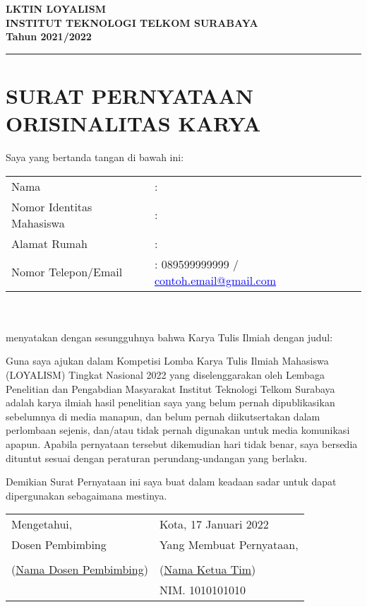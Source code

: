 \begin{center}
    \large \textbf{LKTIN LOYALISM}\\[1ex]
    \large \textbf{INSTITUT TEKNOLOGI TELKOM SURABAYA\\[1ex]
    \large Tahun 2021/2022}
\end{center}
\rule{\textwidth}{1pt}
\section*{\centering SURAT PERNYATAAN ORISINALITAS KARYA}
\noindent Saya yang bertanda tangan di bawah ini:\\

\noindent \begin{tabular}{@{}p{}p{}}
Nama &: \\[.5ex]
Nomor Identitas Mahasiswa &: \\[.5ex]
Alamat Rumah &: \\[.5ex]
Nomor Telepon/Email &: 089599999999 / \href{mailto:contoh.email@gmail.com}{\textcolor{blue}{\underline{contoh.email@gmail.com}}}
\end{tabular}
\\
\vspace{.2cm}
\\
menyatakan dengan sesungguhnya bahwa Karya Tulis Ilmiah dengan judul:

\vspace*{.2cm}

\noindent \textbf{}

\vspace*{.2cm}

\noindent Guna saya ajukan dalam Kompetisi Lomba Karya Tulis Ilmiah Mahasiswa (LOYALISM) Tingkat Nasional 2022 yang diselenggarakan oleh Lembaga Penelitian dan Pengabdian Masyarakat Institut Teknologi Telkom Surabaya adalah karya ilmiah hasil penelitian saya yang belum pernah dipublikasikan sebelumnya di media manapun, dan belum pernah diikutsertakan dalam perlombaan sejenis, dan/atau tidak pernah digunakan untuk media komunikasi apapun. Apabila pernyataan tersebut dikemudian hari tidak benar, saya bersedia dituntut sesuai dengan peraturan perundang-undangan yang berlaku.

\vspace*{.2cm}

\noindent Demikian Surat Pernyataan ini saya buat dalam keadaan sadar untuk dapat dipergunakan sebagaimana mestinya. 
\begin{center}
\begin{tabular}{K{.5\textwidth}K{.5\textwidth}}
     Mengetahui, & Kota, 17 Januari 2022 \\
     Dosen Pembimbing & Yang Membuat Pernyataan,\\
     & \\[10ex]
     (\underline{\quad\quad Nama Dosen Pembimbing\quad\quad}) & (\underline{\quad\quad Nama Ketua Tim\quad\quad})\\
     & NIM. 1010101010
\end{tabular}
\end{center}